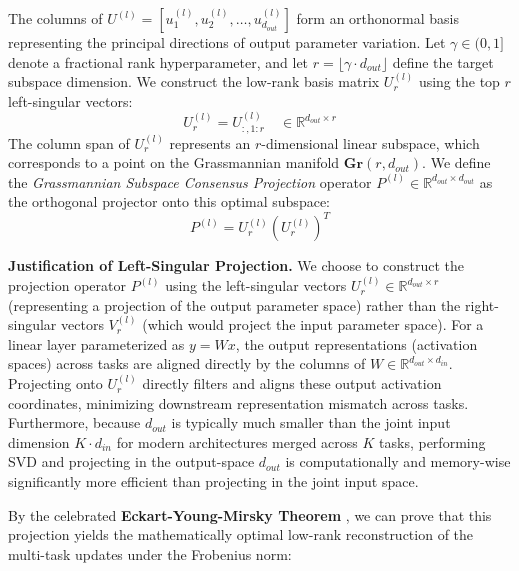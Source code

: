The columns of $U^{(l)} = [u_1^{(l)}, u_2^{(l)}, \dots, u_{d_{out}}^{(l)}]$ form an orthonormal basis representing the principal directions of output parameter variation. Let $\gamma \in (0, 1]$ denote a fractional rank hyperparameter, and let $r = \lfloor \gamma \cdot d_{out} \rfloor$ define the target subspace dimension. We construct the low-rank basis matrix $U_r^{(l)}$ using the top $r$ left-singular vectors:
\begin{equation}
    U_r^{(l)} = U^{(l)}_{:, 1:r} \quad \in \mathbb{R}^{d_{out} \times r}
\end{equation}
The column span of $U_r^{(l)}$ represents an $r$-dimensional linear subspace, which corresponds to a point on the Grassmannian manifold $\mathbf{Gr}(r, d_{out})$. We define the \emph{Grassmannian Subspace Consensus Projection} operator $P^{(l)} \in \mathbb{R}^{d_{out} \times d_{out}}$ as the orthogonal projector onto this optimal subspace:
\begin{equation}
    P^{(l)} = U_r^{(l)} (U_r^{(l)})^T
\end{equation}

\textbf{Justification of Left-Singular Projection.} We choose to construct the projection operator $P^{(l)}$ using the left-singular vectors $U_r^{(l)} \in \mathbb{R}^{d_{out} \times r}$ (representing a projection of the output parameter space) rather than the right-singular vectors $V_r^{(l)}$ (which would project the input parameter space). For a linear layer parameterized as $y = W x$, the output representations (activation spaces) across tasks are aligned directly by the columns of $W \in \mathbb{R}^{d_{out} \times d_{in}}$. Projecting onto $U_r^{(l)}$ directly filters and aligns these output activation coordinates, minimizing downstream representation mismatch across tasks. Furthermore, because $d_{out}$ is typically much smaller than the joint input dimension $K \cdot d_{in}$ for modern architectures merged across $K$ tasks, performing SVD and projecting in the output-space $d_{out}$ is computationally and memory-wise significantly more efficient than projecting in the joint input space.

By the celebrated \textbf{Eckart-Young-Mirsky Theorem} \cite{eckart1936approximation}, we can prove that this projection yields the mathematically optimal low-rank reconstruction of the multi-task updates under the Frobenius norm:

